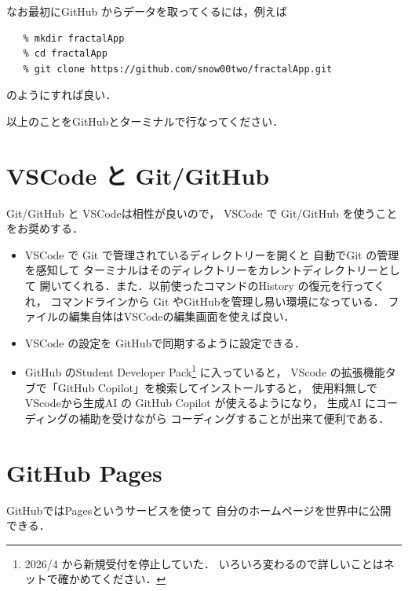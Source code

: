 \begin{itemize}
      なお最初にGitHub からデータを取ってくるには，例えば
 \begin{verbatim}
   % mkdir fractalApp
   % cd fractalApp
   % git clone https://github.com/snow00two/fractalApp.git
\end{verbatim}
      のようにすれば良い．    
      
\end{itemize}

\begin{Q}
   以上のことをGitHubとターミナルで行なってください．
\end{Q}

\section{VSCode と Git/GitHub}
Git/GitHub と VSCodeは相性が良いので，
VSCode で Git/GitHub を使うことをお奨めする．
\begin{itemize}
   \item
      VSCode で Git で管理されているディレクトリーを開くと
      自動でGit の管理を感知して
      ターミナルはそのディレクトリーをカレントディレクトリーとして
      開いてくれる．また．以前使ったコマンドのHistory の復元を行ってくれ，
      コマンドラインから Git やGitHubを管理し易い環境になっている．
      ファイルの編集自体はVSCodeの編集画面を使えば良い．
      
   \item
      VSCode の設定を GitHubで同期するように設定できる．
      
   \item
      GitHub のStudent Developer Pack\footnote{2026/4 から新規受付を停止していた．
      いろいろ変わるので詳しいことはネットで確かめてください．} に入っていると，
      VScode の拡張機能タブで「GitHub Copilot」を検索してインストールすると，
      使用料無しでVScodeから生成AI の GitHub Copilot が使えるようになり，
      生成AI にコーディングの補助を受けながら
      コーディングすることが出来て便利である．
\end{itemize}


\section{GitHub Pages}
GitHubではPagesというサービスを使って
自分のホームページを世界中に公開できる．

